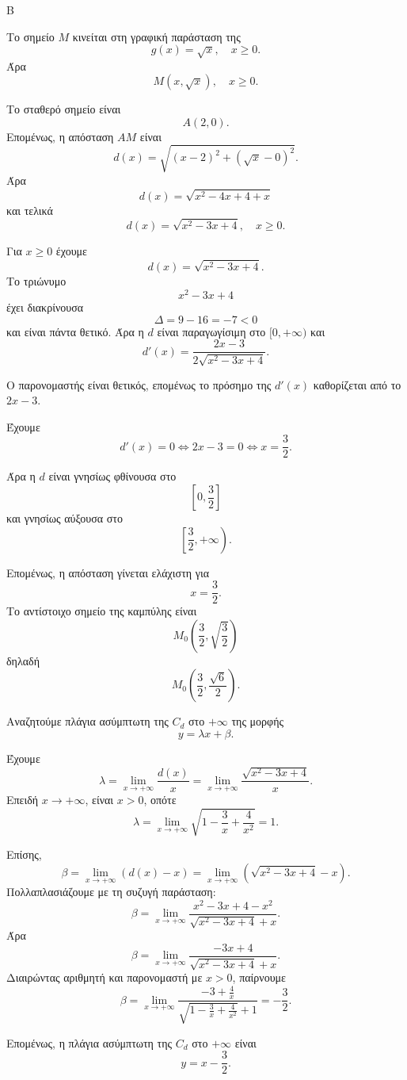 \begin{thema}{Β}
\begin{erwthma}
\item Το σημείο $M$ κινείται στη γραφική παράσταση της
\[
g(x)=\sqrt{x},\quad x\geq 0.
\]
Άρα
\[
M(x,\sqrt{x}),\quad x\geq 0.
\]

Το σταθερό σημείο είναι
\[
A(2,0).
\]
Επομένως, η απόσταση $AM$ είναι
\[
d(x)=\sqrt{(x-2)^2+(\sqrt{x}-0)^2}.
\]
Άρα
\[
d(x)=\sqrt{x^2-4x+4+x}
\]
και τελικά
\[
d(x)=\sqrt{x^2-3x+4},\quad x\geq 0.
\]

\item Για $x\geq 0$ έχουμε
\[
d(x)=\sqrt{x^2-3x+4}.
\]
Το τριώνυμο
\[
x^2-3x+4
\]
έχει διακρίνουσα
\[
\Delta=9-16=-7<0
\]
και είναι πάντα θετικό. Άρα η $d$ είναι παραγωγίσιμη στο $[0,+\infty)$ και
\[
d'(x)=\frac{2x-3}{2\sqrt{x^2-3x+4}}.
\]

Ο παρονομαστής είναι θετικός, επομένως το πρόσημο της $d'(x)$ καθορίζεται από το $2x-3$.

Έχουμε
\[
d'(x)=0 \Leftrightarrow 2x-3=0 \Leftrightarrow x=\frac{3}{2}.
\]

Άρα η $d$ είναι γνησίως φθίνουσα στο
\[
\left[0,\frac{3}{2}\right]
\]
και γνησίως αύξουσα στο
\[
\left[\frac{3}{2},+\infty\right).
\]

Επομένως, η απόσταση γίνεται ελάχιστη για
\[
x=\frac{3}{2}.
\]
Το αντίστοιχο σημείο της καμπύλης είναι
\[
M_0\left(\frac{3}{2},\sqrt{\frac{3}{2}}\right)
\]
δηλαδή
\[
M_0\left(\frac{3}{2},\frac{\sqrt{6}}{2}\right).
\]

\item Αναζητούμε πλάγια ασύμπτωτη της $C_d$ στο $+\infty$ της μορφής
\[
y=\lambda x+\beta.
\]

Έχουμε
\[
\lambda=\lim_{x\to+\infty}\frac{d(x)}{x}
=\lim_{x\to+\infty}\frac{\sqrt{x^2-3x+4}}{x}.
\]
Επειδή $x\to+\infty$, είναι $x>0$, οπότε
\[
\lambda=\lim_{x\to+\infty}\sqrt{1-\frac{3}{x}+\frac{4}{x^2}}=1.
\]

Επίσης,
\[
\beta=\lim_{x\to+\infty}\left(d(x)-x\right)
=\lim_{x\to+\infty}\left(\sqrt{x^2-3x+4}-x\right).
\]
Πολλαπλασιάζουμε με τη συζυγή παράσταση:
\[
\beta=
\lim_{x\to+\infty}
\frac{x^2-3x+4-x^2}{\sqrt{x^2-3x+4}+x}.
\]
Άρα
\[
\beta=
\lim_{x\to+\infty}
\frac{-3x+4}{\sqrt{x^2-3x+4}+x}.
\]
Διαιρώντας αριθμητή και παρονομαστή με $x>0$, παίρνουμε
\[
\beta=
\lim_{x\to+\infty}
\frac{-3+\frac{4}{x}}{\sqrt{1-\frac{3}{x}+\frac{4}{x^2}}+1}
=-\frac{3}{2}.
\]

Επομένως, η πλάγια ασύμπτωτη της $C_d$ στο $+\infty$ είναι
\[
y=x-\frac{3}{2}.
\]


\end{erwthma}
\end{thema}
